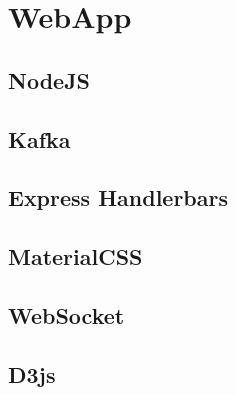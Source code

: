 \section{WebApp}
\label{sec:webapp}

\subsection{NodeJS}
\label{sec:nodejs}

\subsection{Kafka}
\label{sec:Kafka}

\subsection{Express Handlerbars}
\label{sec:express handlerbars}

\subsection{MaterialCSS}
\label{sec:materialCSS}

\subsection{WebSocket}
\label{sec:WebSocket}

\subsection{D3js}
\label{sec:d3js}
